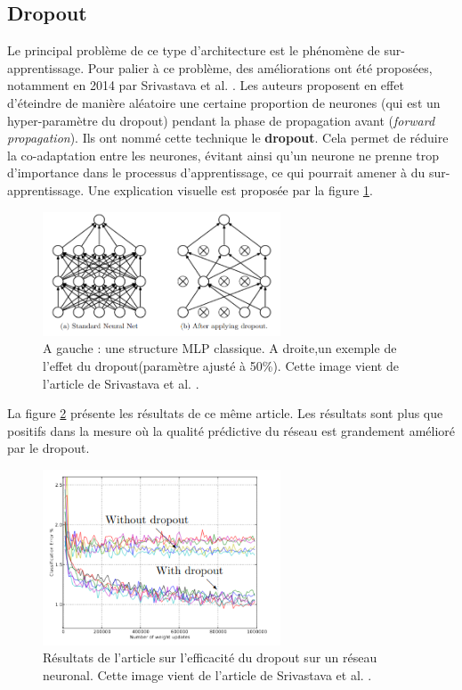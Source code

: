 \subsection{Dropout}

Le principal problème de ce type d'architecture est le phénomène de sur-apprentissage. Pour palier à ce problème, des améliorations ont été proposées, notamment en 2014 par Srivastava et al. \cite{srivastava_dropout_nodate}. Les auteurs proposent en effet d'éteindre de manière aléatoire une certaine proportion de neurones (qui est un hyper-paramètre du dropout) pendant la phase de propagation avant (\textit{forward propagation}). Ils ont nommé cette technique le \textbf{dropout}. Cela permet de réduire la co-adaptation entre les neurones, évitant ainsi qu'un neurone ne prenne trop d'importance dans le processus d'apprentissage, ce qui pourrait amener à du sur-apprentissage. Une explication visuelle est proposée par la figure \ref{dropout}.
 
\begin{figure}[!h]
\centering
\includegraphics[width=200pt]{images/cnn/dropout.png}
\caption{A gauche : une structure MLP classique. A droite,un exemple de l'effet du dropout(paramètre ajusté à 50\%). Cette image vient de l'article de Srivastava et al. \cite{srivastava_dropout_nodate}.}
\label{dropout}
\end{figure}

La figure \ref{dropout_article} présente les résultats de ce même article. Les résultats sont plus que positifs dans la mesure où la qualité prédictive du réseau est grandement amélioré par le dropout.

\begin{figure}[!h]
\centering
\includegraphics[width=200pt]{images/cnn/dropout_article.png}
\caption{Résultats de l'article sur l'efficacité du dropout sur un réseau neuronal. Cette image vient de l'article de Srivastava et al. \cite{srivastava_dropout_nodate}.}
\label{dropout_article}
\end{figure}
 
